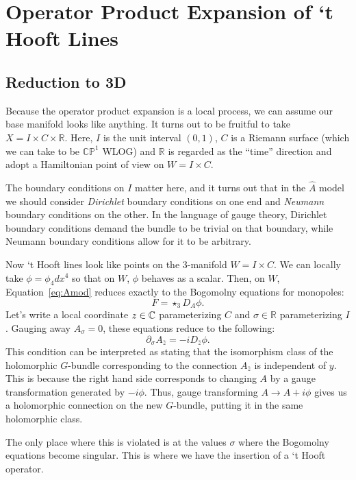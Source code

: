
	\section{Operator Product Expansion of `t Hooft Lines}
	
	\subsection{Reduction to 3D}
	
	Because the operator product expansion is a local process, we can assume our base manifold looks like anything. It turns out to be fruitful to take $X = I \times C \times \mathbb R$. Here, $I$ is the unit interval $(0, 1)$, $C$ is a Riemann surface (which we can take to be $\mathbb{CP}^1$ WLOG) and $\mathbb R$ is regarded as the ``time'' direction and adopt a Hamiltonian point of view on $W = I \times C$. 
	
	The boundary conditions on $I$ matter here, and it turns out that in the $\hat A$ model we should consider \emph{Dirichlet} boundary conditions on one end and \emph{Neumann} boundary conditions on the other. In the language of gauge theory, Dirichlet boundary conditions demand the bundle to be trivial on that boundary, while Neumann boundary conditions allow for it to be arbitrary.
	
	Now `t Hooft lines look like points on the 3-manifold $W = I \times C$. We can locally take $\phi = \phi_4 dx^4$ so that on $W$, $\phi$ behaves as a scalar. Then, on $W$, Equation~\eqref{eq:Amod} reduces exactly to the Bogomolny equations for monopoles:
	\[
		F = \star_3 D_A \phi.
	\]
	Let's write a local coordinate $z \in \mathbb{C}$ parameterizing $C$ and $\sigma \in \mathbb R$ parameterizing $I$.
	Gauging away $A_\sigma = 0$, these equations reduce to the following:
	\[
		\partial_\sigma A_{\bar z} = - i D_{\bar z} \phi.
	\]
	This condition can be interpreted as stating that the isomorphism class of the holomorphic $G$-bundle corresponding to the connection $A_{\bar z}$ is independent of $y$. This is because the right hand side corresponds to changing $A$ by a gauge transformation generated by $-i \phi$. Thus, gauge transforming $A \to A + i \phi$ gives us a holomorphic connection on the new $G$-bundle, putting it in the same holomorphic class.
	
	 The only place where this is violated is at the values $\sigma$ where the Bogomolny equations become singular. This is where we have the insertion of a `t Hooft operator. 
	 
